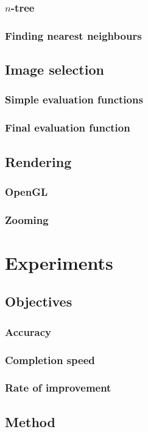   \subsection{$n$-tree}
  \subsection{Finding nearest neighbours}
\section{Image selection}
  \subsection{Simple evaluation functions}
  \subsection{Final evaluation function}
\section{Rendering}
  \subsection{OpenGL}
  \subsection{Zooming}

\chapter{Experiments}
\label{ch:experiments}
\section{Objectives}
  \subsection{Accuracy}
  \subsection{Completion speed}
  \subsection{Rate of improvement}
\section{Method}
